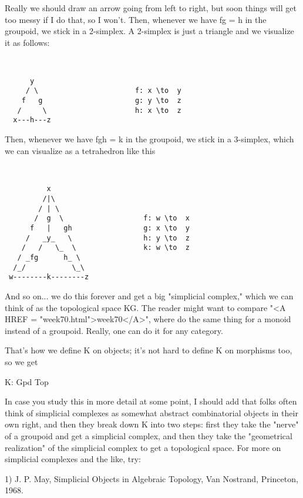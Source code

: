 Really we should draw an arrow going from left to right, but soon
things will get too messy if I do that, so I won't.  Then, whenever we
have fg = h in the groupoid, we stick in a 2-simplex.  A 2-simplex is just
a triangle and we visualize it as follows: 


\begin{verbatim}


      y
     / \                       f: x \to  y
    f   g                      g: y \to  z
   /     \                     h: x \to  z
  x---h---z

\end{verbatim}
    
Then, whenever we have fgh = k in the groupoid, we stick in a 3-simplex,
which we can visualize as a tetrahedron like this


\begin{verbatim}


          x                      
         /|\                    
        / | \                  
       /  g  \                   f: w \to  x      
      f   |   gh                 g: x \to  y
     /   _y_   \                 h: y \to  z
    /   /   \_  \                k: w \to  z
   / _fg      h_ \        
  /_/           \_\      
 w--------k--------z

\end{verbatim}
    
And so on... we do this forever and get a big "simplicial complex,"
which we can think of as the topological space KG.  The reader might
want to compare "<A HREF = "week70.html">week70</A>", where
do the same thing for a monoid instead of a groupoid.  Really, one can
do it for any category.

That's how we define K on objects; it's not hard to define K on
morphisms too, so we get 

                      K: Gpd \to  Top

In case you study this in more detail at some point, I should add that
folks often think of simplicial complexes as somewhat abstract
combinatorial objects in their own right, and then they break down K 
into two steps: first they take the "nerve" of a groupoid and get a
simplicial complex, and then they take the "geometrical realization" of
the simplicial complex to get a topological space.  For more on
simplicial complexes and the like, try:

1) J. P. May, Simplicial Objects in Algebraic Topology, Van Nostrand,
Princeton, 1968.


